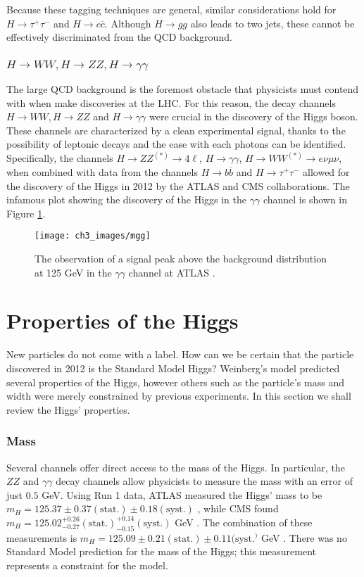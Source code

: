 \documentclass[10pt,a4paper]{book}
\begin{document}
Because these tagging techniques are general, similar considerations hold for $H \rightarrow \tau^+ \tau^-$ and $H \rightarrow c \overline{c}$. Although $H \rightarrow g g$ also leads to two jets, these cannot be effectively discriminated from the QCD background.

\subsubsection{$H\rightarrow WW, H\rightarrow ZZ, H\rightarrow \gamma\gamma$}
The large QCD background is the foremost obstacle that physicists must contend with when make discoveries at the LHC. For this reason, the decay channels  
$H\rightarrow WW, H\rightarrow ZZ$ and $H\rightarrow \gamma\gamma$ were crucial in the discovery of the Higgs boson. These channels are characterized by a clean experimental signal, thanks to the possibility of leptonic decays and the ease with each photons can be identified. Specifically, the channels $H\rightarrow ZZ^{(*)}\rightarrow 4\ell$, $H\rightarrow\gamma\gamma$, $H\rightarrow WW^{(*)} \rightarrow e\nu\mu\nu$, when combined with data from the channels $H\rightarrow b\overline{b}$ and $H \rightarrow \tau^+ \tau^-$ allowed for the discovery of the Higgs in 2012 by the ATLAS and CMS collaborations. The infamous plot showing the discovery of the Higgs in the $\gamma\gamma$ channel is shown in Figure \ref{mgg}.

\begin{figure}
\centering
\texttt{[image: ch3\_images/mgg]}
\caption{The observation of a signal peak above the background distribution at 125 GeV in the $\gamma\gamma$ channel at ATLAS \cite{ATLAS:2012yve}.}
\label{mgg}
\end{figure}

\section{Properties of the Higgs}
New particles do not come with a label. How can we be certain that the particle discovered in 2012 is the Standard Model Higgs? Weinberg's model predicted several properties of the Higgs, however others such as the particle's mass and width were merely constrained by previous experiments. In this section we shall review the Higgs' properties.

\subsubsection{Mass}
Several channels offer direct access to the mass of the Higgs. In particular, the $ZZ$ and $\gamma\gamma$ decay channels allow physicists to measure the mass with an error of just $0.5$ GeV. Using Run 1 data, ATLAS measured the Higgs' mass to be $m_H = 125.37 \pm 0.37(\text{stat.}) \pm 0.18(\text{syst.})$ \cite{ATLAS:2014euz}, while CMS found $m_H = 125.02^{+0.26}_{-0.27}(\text{stat.})^{+0.14}_{-0.15}(\text{syst.})$ GeV \cite{CMS:2014fzn}. The combination of these measurements is $m_H = 125.09 \pm 0.21(\text{stat.})\pm 0.11(\text{syst.}^)$ GeV \cite{ATLAS:2015yey}.  There was no Standard Model prediction for the mass of the Higgs; this measurement represents a constraint for the model.
\end{document}
